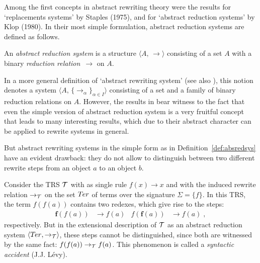 \documentclass[envcountsame,runningheads]{llncs}
\newcommand{\pairlft}{{\langle}}
\newcommand{\pairrgt}{{\rangle}}
\newcommand{\pairsep}{{,\,}\nix}
\newcommand{\pairstr}[1]{\pairlft#1\pairrgt}
\newcommand{\pair}[2]{\pairstr{#1\pairsep#2}}
\newcommand{\nix}{}
\newcommand{\sub}[2]{#1_{#2}}
\newcommand{\funap}[2]{#1(#2)}
\newcommand{\indap}[2]{{\sub{#1}{#2}}}
\newcommand{\bs}{\boldsymbol}
\newcommand{\sred}{{\rightarrow}}
\newcommand{\red}{\mathrel{\sred}}
\newcommand{\sired}{\indap{\sred}}
\newcommand{\ired}[1]{\mathrel{\sired{#1}}}
\newcommand{\atrs}{{\cal T}}
\begin{document}
Among the first concepts in abstract rewriting theory were the
results for `replacements systems' by Staples (1975),
and for `abstract reduction systems' by Klop (1980).
In their most simple formulation, abstract reduction systems
\cite{terese:2003} are defined as follows.


\begin{definition}
  \normalfont 
  \label{def:absredsys}
An \emph{abstract reduction system} is a structure $\pair{A}{\sred}$
  consisting of a set $A$ with a binary \emph{reduction relation}~$\sred$
  on $A$.
\end{definition}


In a more general definition of `abstract rewriting system' 
(see also \cite{terese:2003}),
this notion denotes a system $\pair{A}{\{\sired{\alpha}\}_{\alpha\in I}}$ 
consisting of a set and a family of binary reduction relations on $A$. 
However, the results in \cite[Ch.~1]{terese:2003} bear witness 
to the fact that
even the simple version of abstract reduction system is a very fruitful
concept that leads to many interesting results, which due to their abstract
character can be applied to rewrite systems in general. 

But abstract rewriting systems in the simple form as
in Definition~\ref{def:absredsys}
have an evident drawback: 
they do not allow to distinguish between two different rewrite steps
from an object $a$ to an object $b$. 


\begin{example}
Consider the TRS $\atrs$ with as single rule
$ \funap{f}{x} \red x $
and with the induced rewrite relation $\ired{\atrs}$
  on the set ${\mit T\hspace*{-1pt}er}$ of terms
  over the signature $\Sigma = \{f\}$. 
  In this TRS, the term $\funap{f}{\funap{f}{a}}$ contains two redexes,
  which give rise to the steps:
\begin{align*}
\funap{\bs{f}}{\funap{f}{a}} &\red \funap{f}{a}
&
     \funap{f}{\funap{\bs{f}}{a}} &\red \funap{f}{a} \; , 
\end{align*}
respectively.
  But in the extensional description of $\atrs$ 
  as an abstract reduction system $\pair{{\mit T\hspace*{-1pt}er}}{\sired{\atrs}}$,
these steps cannot be distinguished,
  since both are witnessed by the same fact:
  $\funap{f}{\funap{f}{a}} \ired{\atrs}  \funap{f}{a}$.
  This phenomenon is called 
  a \emph{syntactic accident} (J.J. L\'{e}vy).
\end{example}
\end{document}
